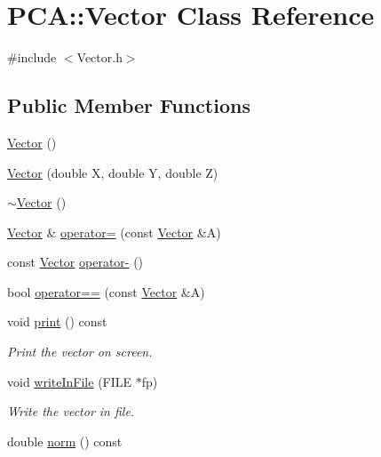 \hypertarget{class_p_c_a_1_1_vector}{}\section{P\+CA\+:\+:Vector Class Reference}
\label{class_p_c_a_1_1_vector}


{\ttfamily \#include $<$Vector.\+h$>$}

\subsection*{Public Member Functions}
\begin{DoxyCompactItemize}
\item 
\hyperlink{class_p_c_a_1_1_vector_a978077a8e59322b44add93906e551719}{Vector} ()
\item 
\hyperlink{class_p_c_a_1_1_vector_aecc7fa6dbaffa3815fd23e4d8202c9b1}{Vector} (double X, double Y, double Z)
\item 
\hyperlink{class_p_c_a_1_1_vector_a3119a6ed9ccd0d7ac61bdfcbc9b7f1d3}{$\sim$\+Vector} ()
\item 
\hyperlink{class_p_c_a_1_1_vector}{Vector} \& \hyperlink{class_p_c_a_1_1_vector_ac93d124518b0f5e39dd1a0973dddc958}{operator=} (const \hyperlink{class_p_c_a_1_1_vector}{Vector} \&A)
\item 
const \hyperlink{class_p_c_a_1_1_vector}{Vector} \hyperlink{class_p_c_a_1_1_vector_ac94bf46625448a0ece199c2021993e6c}{operator-\/} ()
\item 
bool \hyperlink{class_p_c_a_1_1_vector_ae7a1abe13c8313d717b7bdb66934e92b}{operator==} (const \hyperlink{class_p_c_a_1_1_vector}{Vector} \&A)
\item 
void \hyperlink{class_p_c_a_1_1_vector_a6411d63770d6d711c5c854e21ca1776e}{print} () const
\begin{DoxyCompactList}\small\item\em Print the vector on screen. \end{DoxyCompactList}\item 
void \hyperlink{class_p_c_a_1_1_vector_a661570b8bb883ca11f033ea4dcdebb79}{write\+In\+File} (F\+I\+LE $\ast$fp)
\begin{DoxyCompactList}\small\item\em Write the vector in file. \end{DoxyCompactList}\item 
double \hyperlink{class_p_c_a_1_1_vector_a709eef286197f64e45f35fce0925ddf0}{norm} () const
\end{DoxyCompactItemize}
